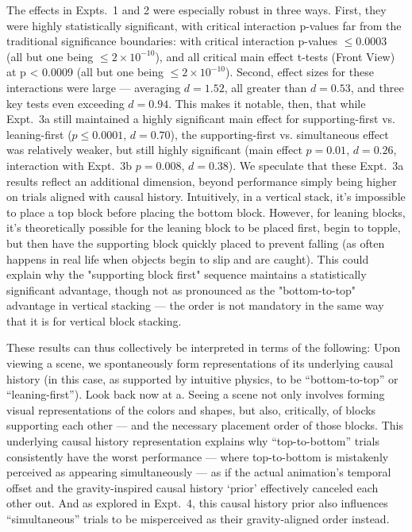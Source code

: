 The effects in Expts.~1 and 2 were especially robust in three ways.   First, they were highly statistically significant, with critical interaction p-values far from the traditional significance boundaries:  with critical interaction p-values $\leq 0.0003$ (all but one being $\leq 2\times10^{-10}$), and all critical main effect t-tests (Front View) at p < 0.0009 (all but one being $\leq 2\times10^{-10}$). Second, effect sizes for these interactions were large --- averaging $d = 1.52$, all greater than $d = 0.53$, and three key tests even exceeding $d = 0.94$.  This makes it notable, then, that while Expt.~3a still maintained a highly significant main effect for supporting-first vs. leaning-first ($p \leq 0.0001$, $d = 0.70$), the supporting-first vs. simultaneous effect was relatively weaker, but still highly significant (main effect $p = 0.01$, $d = 0.26$, interaction with Expt.~3b $p = 0.008$,  $d =  0.38$). We speculate that these Expt.~3a results reflect an additional dimension, beyond performance simply being higher on trials aligned with causal history. Intuitively, in a vertical stack, it's impossible to place a top block before placing the bottom block. However, for leaning blocks, it's theoretically possible for the leaning block to be placed first, begin to topple, but then have the supporting block quickly placed to prevent falling (as often happens in real life when objects begin to slip and are caught). This could explain why the "supporting block first" sequence maintains a statistically significant advantage, though not as pronounced as the "bottom-to-top" advantage in vertical stacking --- the order is not mandatory in the same way that it is for vertical block stacking.  

These results can thus collectively be interpreted in terms of the following: Upon viewing a scene, we spontaneously form representations of its underlying causal history (in this case, as supported by intuitive physics, to be “bottom-to-top” or “leaning-first”).  Look back now at a.  Seeing a scene not only involves forming visual representations of the colors and shapes, but also, critically, of blocks supporting each other --- and the necessary placement order of those blocks.  This underlying causal history representation explains why “top-to-bottom” trials consistently have the worst performance --- where top-to-bottom is mistakenly perceived as appearing simultaneously --- as if the actual animation’s temporal offset and the gravity-inspired causal history ‘prior’ effectively canceled each other out\footnotemark.  And as explored in Expt.~4, this causal history prior also influences “simultaneous” trials to be misperceived as their gravity-aligned order instead. 

